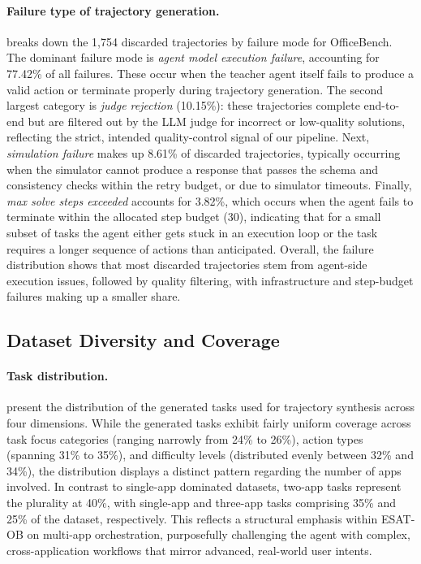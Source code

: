 \paragraph{Failure type of trajectory generation.}
 breaks down the 1,754 discarded trajectories by failure mode for OfficeBench. The dominant failure mode is \emph{agent model execution failure}, accounting for 77.42\% of all failures. These occur when the teacher agent itself fails to produce a valid action or terminate properly during trajectory generation. The second largest category is \emph{judge rejection} (10.15\%): these trajectories complete end-to-end but are filtered out by the LLM judge for incorrect or low-quality solutions, reflecting the strict, intended quality-control signal of our pipeline. Next, \emph{simulation failure} makes up 8.61\% of discarded trajectories, typically occurring when the simulator cannot produce a response that passes the schema and consistency checks within the retry budget, or due to simulator timeouts. Finally, \emph{max solve steps exceeded} accounts for 3.82\%, which occurs when the agent fails to terminate within the allocated step budget (30), indicating that for a small subset of tasks the agent either gets stuck in an execution loop or the task requires a longer sequence of actions than anticipated. Overall, the failure distribution shows that most discarded trajectories stem from agent-side execution issues, followed by quality filtering, with infrastructure and step-budget failures making up a smaller share.



\subsection{Dataset Diversity and Coverage}






\paragraph{Task distribution.}
 present the distribution of the generated tasks used for trajectory synthesis across four dimensions. While the generated tasks exhibit fairly uniform coverage across task focus categories (ranging narrowly from 24\% to 26\%), action types (spanning 31\% to 35\%), and difficulty levels (distributed evenly between 32\% and 34\%), the distribution displays a distinct pattern regarding the number of apps involved. In contrast to single-app dominated datasets, two-app tasks represent the plurality at 40\%, with single-app and three-app tasks comprising 35\% and 25\% of the dataset, respectively. This reflects a structural emphasis within \textsc{ESAT}-OB on multi-app orchestration, purposefully challenging the agent with complex, cross-application workflows that mirror advanced, real-world user intents.

